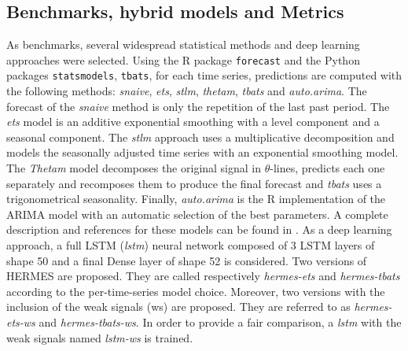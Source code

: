\documentclass[review]{elsarticle}
\begin{document}
\subsection{Benchmarks, hybrid models and Metrics}

As benchmarks, several widespread statistical methods and deep learning approaches were selected. Using the R package \texttt{forecast} and the Python packages \texttt{statsmodels},  \texttt{tbats}, for each time series, predictions are computed with the following methods: \textit{snaive}, \textit{ets}, \textit{stlm}, \textit{thetam}, \textit{tbats} and \textit{auto.arima}. The forecast of the \textit{snaive} method is only the repetition of the last past period. The \textit{ets} model is an additive exponential smoothing with a level component and a seasonal component. The \textit{stlm} approach uses a multiplicative decomposition and models the seasonally adjusted time series with an exponential smoothing model. The \textit{Thetam} model decomposes the original signal in $\theta$-lines, predicts each one separately and recomposes them to produce the final forecast and \textit{tbats} uses a trigonometrical seasonality. Finally, \textit{auto.arima} is the R implementation of the ARIMA model with an automatic selection of the best parameters. A complete description and references for these models can be found in \cite{hyndman2020package}. As a deep learning approach, a full LSTM (\textit{lstm}) neural network composed of 3 LSTM layers of shape 50 and a final Dense layer of shape 52 is considered.
Two versions of HERMES are proposed. They are called respectively \textit{hermes-ets} and \textit{hermes-tbats} according to the per-time-series model choice. Moreover, two versions with the inclusion of the weak signals (ws) are proposed. They are referred to as \textit{hermes-ets-ws} and \textit{hermes-tbats-ws}. In order to provide a fair comparison, a \textit{lstm} with the weak signals named \textit{lstm-ws} is trained.
\end{document}

